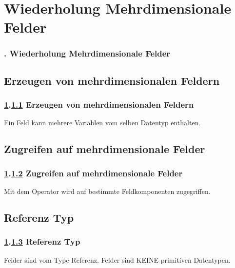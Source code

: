 \def\stitle{Wiederholung Mehrdimensionale Felder}
\section{\stitle}\label{K:wdh}
\begin{frame}
  \frametitle{\kap. \stitle}%
\tableofcontents[current]
\end{frame}
\def\stitle{Erzeugen von mehrdimensionalen Feldern}
\subsection{\stitle}\label{S:Erzeugen}
\begin{frame}[t]%
  \frametitle{\ref{K:wdh}.\ref{S:Erzeugen} \stitle}

Ein Feld kann mehrere Variablen vom selben Datentyp enthalten.


\end{frame}


\def\stitle{Zugreifen auf mehrdimensionale Felder}
\subsection{\stitle}\label{S:Zugreifen}
\begin{frame}[t]%
  \frametitle{\ref{K:wdh}.\ref{S:Zugreifen} \stitle}

Mit dem Operator \code{[]} wird auf bestimmte Feldkomponenten zugegriffen.


\end{frame}


\def\stitle{Referenz Typ}
\subsection{\stitle}\label{S:Ref}
\begin{frame}[t]%
  \frametitle{\ref{K:wdh}.\ref{S:Ref} \stitle}

Felder sind vom Type Referenz.
Felder sind \textcolor{KITred}{KEINE} primitiven Datentypen.

\end{frame}
